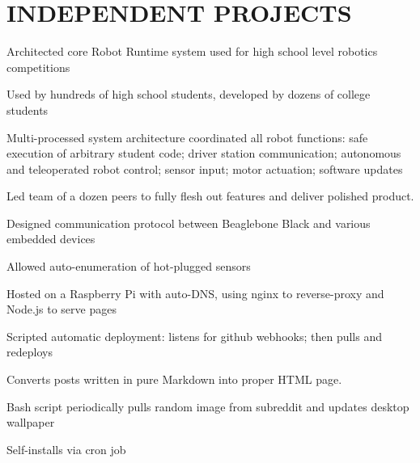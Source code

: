 \documentclass[]{resume}
\begin{document}
\begin{minipage}[t]{0.66\textwidth}

\section{INDEPENDENT PROJECTS}

\begin{tightemize}
\item Architected core Robot Runtime system used for high school level robotics competitions
\item Used by hundreds of high school students, developed by dozens of college students
\item Multi-processed system architecture coordinated all robot functions: safe execution of arbitrary student code; driver station communication; autonomous and teleoperated robot control; sensor input; motor actuation; software updates
\item Led team of a dozen peers to fully flesh out features and deliver polished product.
\item Designed communication protocol between Beaglebone Black and various embedded devices
\item Allowed auto-enumeration of hot-plugged sensors
\end{tightemize}
\sectionsep

\begin{tightemize}
\item Hosted on a Raspberry Pi with auto-DNS, using nginx to reverse-proxy and Node.js to serve pages
\item Scripted automatic deployment: listens for github webhooks; then pulls and redeploys
\item Converts posts written in pure Markdown into proper HTML page.
\end{tightemize}
\sectionsep

\begin{tightemize}
\item Bash script periodically pulls random image from subreddit and updates desktop wallpaper
\item Self-installs via cron job
\end{tightemize}
\sectionsep


\end{minipage} 
\end{document}
